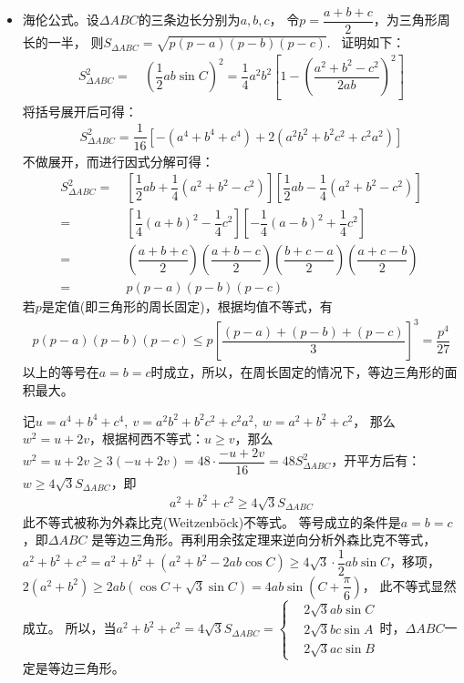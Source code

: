\begin{itemize}[leftmargin=\inteval{\myitemleftmargin}pt,itemsep=
   \inteval{\myitemitempsep}pt,topsep=\inteval{\myitemtopsep}pt]
\item 海伦公式。设$ \Delta ABC $的三条边长分别为$ a,b,c $，
令$ p=\dfrac{a+b+c}{2} $，为三角形周长的一半，
则$ S_{\Delta ABC}=\sqrt{p(p-a)(p-b)(p-c)} $. \ 证明如下：
\begin{align*}
    S_{\Delta ABC}^2=&\ \left(\dfrac{1}{2}ab\sin C \right) ^2=
    \dfrac{1}{4}a^2b^2\left[ 1-\left( {\dfrac{a^2+b^2-c^2}{2ab}}\right)^2 \right] 
\end{align*}
将括号展开后可得：
\begin{align*}
    S_{\Delta ABC}^2=\dfrac{1}{16}\left[-(a^4+b^4+c^4)+2(a^2b^2+b^2c^2+c^2a^2)\right]
\end{align*}
不做展开，而进行因式分解可得：
\begin{align*}
    S_{\Delta ABC}^2
    =&\ \left[ \dfrac{1}{2}ab+\dfrac{1}{4}
    (a^2+b^2-c^2)\right] \left[ \dfrac{1}{2}ab-\dfrac{1}{4} (a^2+b^2-c^2) \right] \\
    =&\ \left[  \dfrac{1}{4}(a+b)^2-\dfrac{1}{4}c^2 \right] 
    \left[ -\dfrac{1}{4}(a-b)^2+\dfrac{1}{4}c^2 \right] \\
    =&\ \left(\dfrac{a+b+c}{2}\right) \left(\dfrac{a+b-c}{2}\right) 
    \left(\dfrac{b+c-a}{2}\right) \left(\dfrac{a+c-b}{2}\right) \\
    =&\ p(p-a)(p-b)(p-c)
\end{align*}
若$ p $是定值(即三角形的周长固定)，根据均值不等式，有
\begin{gather}\label{正三角形面积最大}
    p(p-a)(p-b)(p-c)\leq p\left[\dfrac{(p-a)+(p-b)+(p-c)}{3}\right]^3=\dfrac{p^4}{27}
\end{gather}
以上的等号在$ a=b=c $时成立，所以，在周长固定的情况下，等边三角形的面积最大。

记$ u=a^4+b^4+c^4,\ v=a^2b^2+b^2c^2+c^2a^2 ,\ w=a^2+b^2+c^2 $，
那么$ w^2=u+2v $，根据柯西不等式：$ u\geq v $，那么$ w^2=u+2v \geq 3(-u+2v)=
48 \cdot \dfrac{-u+2v}{16}=48 S_{\Delta ABC}^2 $，开平方后有：
$ w\geq 4\sqrt{3}S_{\Delta ABC} $，即
\begin{gather}\label{外森比克不等式}
    a^2+b^2+c^2 \geq 4\sqrt{3}S_{\Delta ABC}
\end{gather}
此不等式被称为外森比克(Weitzenböck)不等式。
等号成立的条件是$ a=b=c $，即$ \Delta ABC $
是等边三角形。再利用余弦定理来逆向分析外森比克不等式，
$ a^2+b^2+c^2=a^2+b^2+(a^2+b^2-2ab\cos C)\geq 4\sqrt{3}\cdot
\dfrac{1}{2}ab\sin C $，移项，
$ 2(a^2+b^2)\geq 2ab(\cos C+\sqrt{3}\sin C)=4ab\sin(C+\dfrac{\pi}{6}) $，
此不等式显然成立。 所以，当$ a^2+b^2+c^2=4\sqrt{3}S_{\Delta ABC}=
\begin{cases}
    & 2\sqrt{3}ab\sin C \\
    & 2\sqrt{3}bc\sin A \\
    & 2\sqrt{3}ac\sin B
\end{cases}$时，$ \Delta ABC $一定是等边三角形。


\end{itemize}
